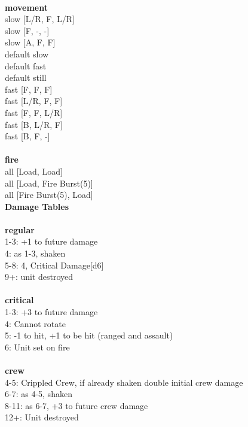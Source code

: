\ \\ {\bf movement } \\
slow [L/R, F, L/R] \\
slow [F, -, -] \\
slow [A, F, F] \\
default slow \\
default fast \\
default still \\
fast [F, F, F] \\
fast [L/R, F, F] \\
fast [F, F, L/R] \\
fast [B, L/R, F] \\
fast [B, F, -] \\
\ \\ {\bf fire } \\
all [Load, Load] \\
all [Load, Fire Burst(5)] \\
all [Fire Burst(5), Load] \\


{\bf Damage Tables} \\
\ \\ {\bf regular } \\
1-3: +1 to future damage \\
4: as 1-3, shaken \\
5-8: 4, Critical Damage[d6] \\
9+: unit destroyed \\
\ \\ {\bf critical } \\
1-3: +3 to future damage \\
4: Cannot rotate \\
5: -1 to hit, +1 to be hit (ranged and assault) \\
6: Unit set on fire \\
\ \\ {\bf crew } \\
4-5: Crippled Crew, if already shaken double initial crew damage \\
6-7: as 4-5, shaken \\
8-11: as 6-7, +3 to future crew damage \\
12+: Unit destroyed \\


